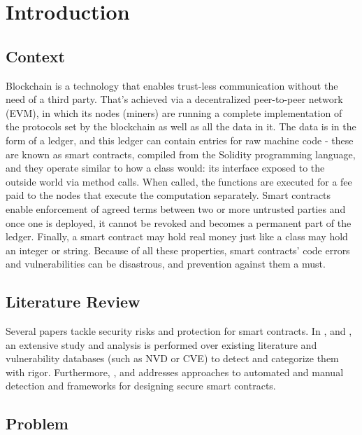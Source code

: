 \chapter{Introduction}        
\label{ch:introducao}

\section{Context}\label{contextualizacao}

Blockchain is a technology that enables trust-less communication without the need of a third party. That’s achieved via a decentralized peer-to-peer network (EVM), in which its nodes (miners) are running a complete implementation of the protocols set by the blockchain as well as all the data in it. The data is in the form of a ledger, and this ledger can contain entries for raw machine code - these are known as smart contracts, compiled from the Solidity programming language, and they operate similar to how a class would: its interface exposed to the outside world via method calls. When called, the functions are executed for a fee paid to the nodes that execute the computation separately. Smart contracts enable enforcement of agreed terms between two or more untrusted parties and once one is deployed, it cannot be revoked and becomes a permanent part of the ledger. Finally, a smart contract may hold real money just like a class may hold an integer or string. Because of all these properties, smart contracts’ code errors and vulnerabilities can be disastrous, and prevention against them a must.  

\section{Literature Review}

Several papers tackle security risks and protection for smart contracts. In \cite{chen2020survey}, \cite{kushwaha2022systematic} and \cite{sayeed2020smart}, an extensive study and analysis is performed over existing literature and vulnerability databases (such as NVD or CVE) to detect and categorize them with rigor. Furthermore, \cite{singh2020blockchain}, \cite{ali2021sescon} and \cite{vivar2021security} addresses approaches to automated and manual detection and frameworks for designing secure smart contracts.  

\section{Problem}

